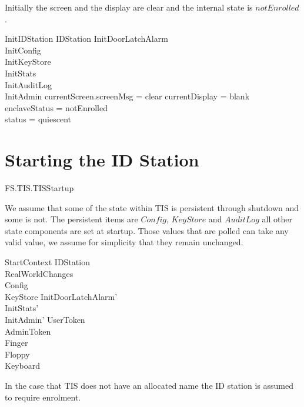 Initially the screen and the display are clear and the internal state
is $notEnrolled$.

\begin{schema}{InitIDStation}
        IDStation
\also
	InitDoorLatchAlarm
\\	InitConfig
\\      InitKeyStore
\\      InitStats
\\      InitAuditLog
\\      InitAdmin
\where
        currentScreen.screenMsg = clear
\also
	currentDisplay = blank
\\	enclaveStatus = notEnrolled
\\      status = quiescent
\end{schema}

\section{Starting the ID Station}
\begin{traceunit}{FS.TIS.TISStartup}
\end{traceunit}


We assume that some of the state within TIS is persistent through
shutdown and some is not. 
The persistent items are $Config$, $KeyStore$ and $AuditLog$ all other state
components are set at startup. Those values that are polled can take
any valid value, we assume for simplicity that they remain unchanged.

\begin{schema}{StartContext}
        \Delta IDStation
\\      RealWorldChanges
\also
\\      \Xi Config
\\      \Xi KeyStore
\also
	InitDoorLatchAlarm'
\\      InitStats'
\\      InitAdmin'
\also
        \Xi UserToken  
\\      \Xi AdminToken 
\\      \Xi Finger 
\\      \Xi Floppy 
\\      \Xi Keyboard 
\end{schema}

In the case that TIS does not have an allocated name the ID station is
assumed to require enrolment.

